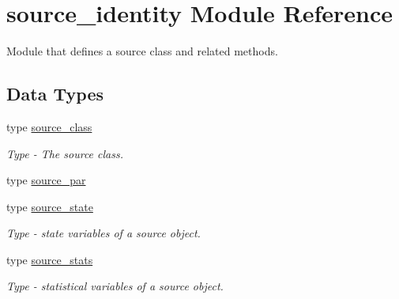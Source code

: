 \hypertarget{namespacesource__identity}{}\section{source\+\_\+identity Module Reference}
\label{namespacesource__identity}


Module that defines a source class and related methods.  


\subsection*{Data Types}
\begin{DoxyCompactItemize}
\item 
type \mbox{\hyperlink{structsource__identity_1_1source__class}{source\+\_\+class}}
\begin{DoxyCompactList}\small\item\em Type -\/ The source class. \end{DoxyCompactList}\item 
type \mbox{\hyperlink{structsource__identity_1_1source__par}{source\+\_\+par}}
\item 
type \mbox{\hyperlink{structsource__identity_1_1source__state}{source\+\_\+state}}
\begin{DoxyCompactList}\small\item\em Type -\/ state variables of a source object. \end{DoxyCompactList}\item 
type \mbox{\hyperlink{structsource__identity_1_1source__stats}{source\+\_\+stats}}
\begin{DoxyCompactList}\small\item\em Type -\/ statistical variables of a source object. \end{DoxyCompactList}\end{DoxyCompactItemize}
